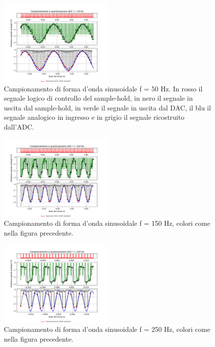 \documentclass[journal]{IEEEtran}
\begin{document}
\clearpage
\clearpage
\begin{figure}[H]%
\begin{center}
\includegraphics[trim={0 25 0 0}, clip, width=0.50\textwidth]{analysis/output/campionamento_50Hz.pdf}

\caption{Campionamento di forma d'onda sinusoidale f = 50 Hz. In rosso il segnale logico di controllo del sample-hold, in nero il segnale in uscita dal sample-hold, in verde il segnale in uscita dal DAC, il blu il segnale analogico in ingresso e in grigio il segnale ricostruito dall'ADC.}
\label{fig:graph_ring_oscillator}
\end{center}
\end{figure}
\vspace{-10mm}
%
\begin{figure}[H]%
\begin{center}
\includegraphics[trim={0 25 0 0}, clip,width=0.50\textwidth]{analysis/output/campionamento_150Hz.pdf}
\caption{Campionamento di forma d'onda sinusoidale f = 150 Hz, colori come nella figura precedente.}
\label{fig:graph_ring_oscillator}
\end{center}
\end{figure}
\vspace{-10mm}
%
\begin{figure}[H]%
\begin{center}
\includegraphics[trim={0 25 0 0}, clip,width=0.50\textwidth]{analysis/output/campionamento_250Hz.pdf}
\caption{Campionamento di forma d'onda sinusoidale f = 250 Hz, colori come nella figura precedente.}
\label{fig:graph_ring_oscillator}
\end{center}
\end{figure}
\end{document}
